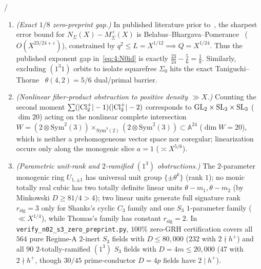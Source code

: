 \begin{obstruction}\label{obs:4:s3}
\tagProved{} / \tagObs{}
\begin{enumerate}[label=\textup{(\roman*)}]
\item \emph{(Exact $1/8$ zero-preprint gap.)} In published literature prior to~\cite{ST2025a,ST2025b}, the sharpest error bound for $N_\Sigma(X) - M_\Sigma^+(X)$ is Belabas--Bhargava--Pomerance~\cite{BBP2010} ($O(X^{23/24+\varepsilon})$), constrained by $q^2 \le L = X^{1/12} \implies Q = X^{1/24}$. Thus the published exponent gap in~\eqref{eq:4:N0id} is exactly $\frac{23}{24} - \frac{5}{6} = \frac{1}{8}$. Similarly, excluding $(1^3 1)$ orbits to isolate squarefree $\Sigma_0$ hits the exact Taniguchi--Thorne~\cite{TT2020} $\theta(4,2) = 5/6$ dual/primal barrier.
\item \emph{(Nonlinear fiber-product obstruction to positive density $\gg X$.)} Counting the second moment $\sum(|\mathrm{Cl}_2^+|-1)(|\mathrm{Cl}_2^+|-2)$ corresponds to $\mathrm{GL}_2 \times \mathrm{SL}_3 \times \mathrm{SL}_3$ ($\dim 20$) acting on the nonlinear complete intersection $W = (2\otimes\mathrm{Sym}^2(3)) \times_{\mathrm{Sym}^3(2)} (2\otimes\mathrm{Sym}^2(3)) \subset \mathbb{A}^{24}$ ($\dim W = 20$), which is neither a prehomogeneous vector space nor coregular; linearization occurs only along the monogenic slice $a = 1$ ($\asymp X^{5/6}$).
\item \emph{(Parametric unit-rank and $2$-ramified $(1^3)$ obstructions.)} The $2$-parameter monogenic ring $U_{1,\pm 1}$ has universal unit group $\{\pm \theta^k\}$ (rank $1$); no monic totally real cubic has two totally definite linear units $\theta - m_1, \theta - m_2$ (by Minkowski $D \ge 81/4 > 4$); two linear units generate full signature rank $r_{\mathrm{sig}} = 3$ only for Shanks's cyclic $C_3$ family and one $S_3$ $1$-parameter family ($\ll X^{1/4}$), while Thomas's family has constant $r_{\mathrm{sig}} = 2$. In \texttt{verify\_n02\_s3\_zero\_preprint.py}, $100\%$ zero-GRH certification covers all $564$ pure Regime-A $2$-inert $S_3$ fields with $D \le 80{,}000$ ($232$ with $2 \nmid h^+$) and all $90$ $2$-totally-ramified $(1^3)$ $S_3$ fields with $D = 4m \le 20{,}000$ ($47$ with $2 \nmid h^+$, though $30/45$ prime-conductor $D=4p$ fields have $2 \mid h^+$).
\end{enumerate}
\end{obstruction}
